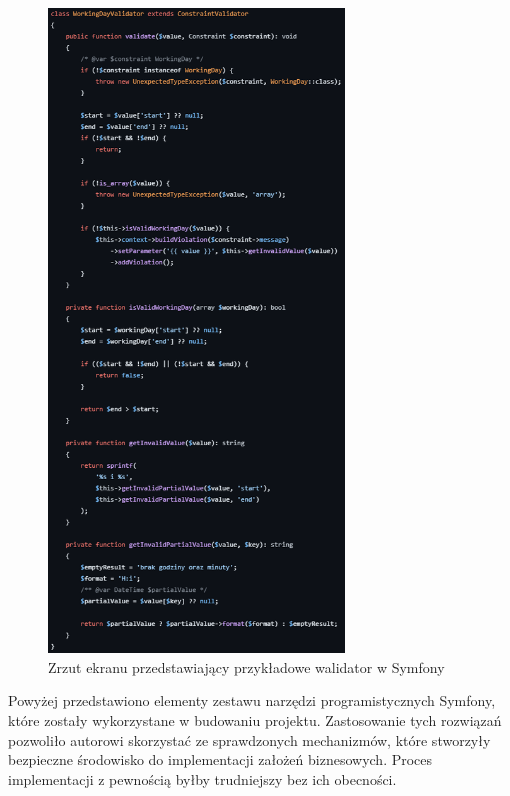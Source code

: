 \documentclass[12pt,twoside]{book}
\newcommand{\captionvspace}{\vspace{6pt}}
\begin{document}
    \begin{figure}[ht]
        \centering
        \includegraphics[width=0.7\textwidth]{includes/images/example-validator-before-migration.png}
        \captionvspace
        \caption{Zrzut ekranu przedstawiający przykładowe walidator w Symfony}
        \label{fig:example-sdiwpil-validator}
    \end{figure}

    Powyżej przedstawiono elementy zestawu narzędzi programistycznych Symfony, które zostały wykorzystane w budowaniu projektu. Zastosowanie tych rozwiązań pozwoliło autorowi skorzystać ze sprawdzonych mechanizmów, które stworzyły bezpieczne środowisko do implementacji założeń biznesowych. Proces implementacji z pewnością byłby trudniejszy bez ich obecności.
\end{document}
